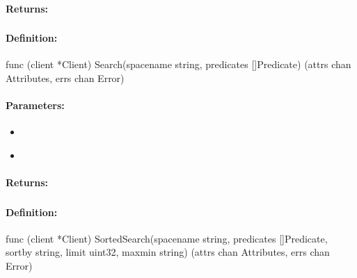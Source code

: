 \paragraph{Returns:}


\pagebreak
\subsubsection{}
\label{api:Go:Search}


\paragraph{Definition:}
\begin{gocode}
func (client *Client) Search(spacename string, predicates []Predicate) (attrs chan Attributes, errs chan Error)
\end{gocode}

\paragraph{Parameters:}
\begin{itemize}[noitemsep]
\item {}\\

\item {}\\

\end{itemize}

\paragraph{Returns:}


\pagebreak
\subsubsection{}
\label{api:Go:SortedSearch}


\paragraph{Definition:}
\begin{gocode}
func (client *Client) SortedSearch(spacename string, predicates []Predicate, sortby string, limit uint32, maxmin string) (attrs chan Attributes, errs chan Error)
\end{gocode}

